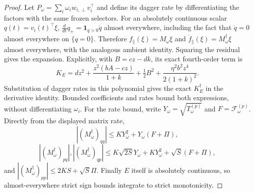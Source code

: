 \documentclass{article} %
\theoremstyle{plain}
\theoremstyle{definition}
\theoremstyle{remark}
\begin{document}
\begin{proof}
Let $P_\omega=\sum_i\omega_iw_{i,\perp}v_i^\top$ and define its dagger
rate by differentiating the factors with the same frozen selectors.
For an absolutely continuous scalar $q(t)=v_i(t)^\top\xi$,
$\frac{d}{dt}q_+=\mathbf1_{q>0}\dot q$ almost everywhere, including
the fact that $\dot q=0$ almost everywhere on $\{q=0\}$.
Therefore $f_\parallel(\xi)=M_\omega\xi$ and
$\dot f_\parallel(\xi)=M_\omega^\dagger\xi$ almost everywhere, with the
analogous ambient identity. Squaring the residual gives the expansion.
Explicitly, with $B=cz-dk$, its exact fourth-order term is
\[
 K_E=dz^2+\frac{z^2(bA-cz)}{1+k}
             +\tfrac12 B^2+\frac{\eta^2b^2z^4}{2(1+k)^2}.
\]
Substitution of dagger rates in this polynomial gives the exact
$K_E^\dagger$ in the derivative identity. Bounded coefficients and rates
bound both expressions, without differentiating $\omega_i$.
For the rate bound, write $Y_\omega=\sqrt{T_\omega^{(p)}}$ and
$F=\mathcal F_\omega^{(p)}$. Directly from the displayed matrix rate,
\[
 |(M_\omega^\dagger)_{qq}|
 \le K Y_\omega^2+Y_\omega(F+\Pi),
\]
\[
 |(M_\omega^\dagger)_{pq}|,|(M_\omega^\dagger)_{qp}|
 \le K\sqrt{2S}Y_\omega+K Y_\omega^2+\sqrt S(F+\Pi),
\]
and $|(M_\omega^\dagger)_{pp}|\le2KS+\sqrt S\Pi$.
Finally $E$ itself is absolutely continuous, so almost-everywhere strict
sign bounds integrate to strict monotonicity.
\end{proof}
\end{document}
